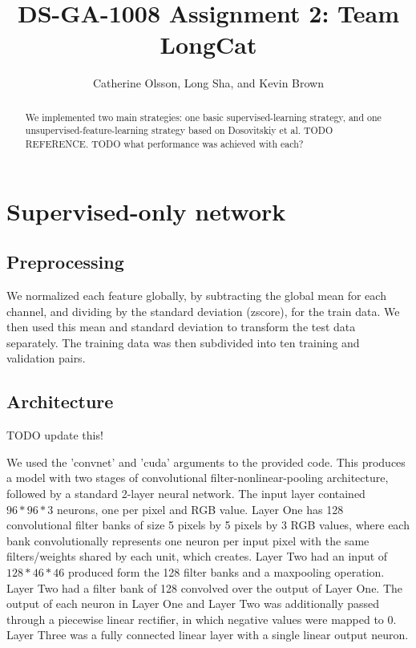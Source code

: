 \documentclass{article} %
\title{DS-GA-1008 Assignment 2: Team LongCat}
\author{
Catherine Olsson, Long Sha, and Kevin Brown \\
}
\begin{document}
\maketitle

\begin{abstract}
We implemented two main strategies: one basic supervised-learning
strategy, and one unsupervised-feature-learning strategy based on Dosovitskiy
et al. TODO REFERENCE. TODO what performance was achieved with each?
\end{abstract}


\section{Supervised-only network}

\subsection{Preprocessing}

We normalized each feature globally, by subtracting the global mean for each
channel, and dividing by the standard deviation (zscore), for the train data.
We then used this mean and standard deviation to transform the test data
separately. The training data was then subdivided into ten training and validation
pairs. 

\subsection{Architecture}
TODO update this!

We used the 'convnet' and 'cuda' arguments to the provided code. This produces
a model with two stages of convolutional filter-nonlinear-pooling architecture,
followed by a standard 2-layer neural network. The input layer contained
$96*96*3$ neurons, one per pixel and RGB value. Layer One has 128 convolutional
filter banks of size 5 pixels by 5 pixels by 3 RGB values, where each bank
convolutionally represents one neuron per input pixel with the same
filters/weights shared by each unit, which creates. Layer Two had an input of
$128*46*46$ produced form the 128 filter banks and a maxpooling operation.
Layer Two had a filter bank of 128 convolved over the output of Layer One.  The
output of each neuron in Layer One and Layer Two was additionally passed
through a piecewise linear rectifier, in which negative values were mapped to
0. Layer Three was a fully connected linear layer with a single linear output
neuron.  
\end{document}
